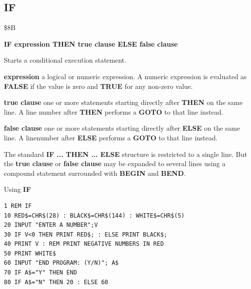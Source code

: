 
\newpage
\subsection{IF}
\begin{description}[leftmargin=2cm,style=nextline]
\item [Token:] \$8B
\item [Format:] {\bf IF expression THEN true clause ELSE false clause}
\item [Usage:] Starts a conditional execution
               statement.

                {\bf expression} a logical or numeric expression.
                A numeric expression is evaluated as {\bf FALSE}
                if the value is zero and {\bf TRUE} for any non-zero
                value.

                {\bf true clause} one or more statements starting
                directly after {\bf THEN} on the same line.
                A line number after {\bf THEN} performs a
                {\bf GOTO} to that line instead.

                {\bf false clause} one or more statements starting
                directly after {\bf ELSE} on the same line.
                A linenumber after {\bf ELSE} performs a
                {\bf GOTO} to that line instead.

\item [Remarks:]
               The standard {\bf IF ... THEN ... ELSE} structure
               is restricted to a single line. But the {\bf true clause}
               or {\bf false clause} may be expanded to several lines
               using a compound statement surrounded with
               {\bf BEGIN} and {\bf BEND}.
\item [Example:]
                Using {\bf IF}
\begin{tcolorbox}[colback=black,coltext=white]
\verbatimfont{\codefont}
\begin{verbatim}
1 REM IF
10 RED$=CHR$(28) : BLACK$=CHR$(144) : WHITE$=CHR$(5)
20 INPUT "ENTER A NUMBER";V
30 IF V<0 THEN PRINT RED$; : ELSE PRINT BLACK$;
40 PRINT V : REM PRINT NEGATIVE NUMBERS IN RED
50 PRINT WHITE$
60 INPUT "END PROGRAM: (Y/N)"; A$
70 IF A$="Y" THEN END
80 IF A$="N" THEN 20 : ELSE 60
\end{verbatim}
\end{tcolorbox}
\end{description}

